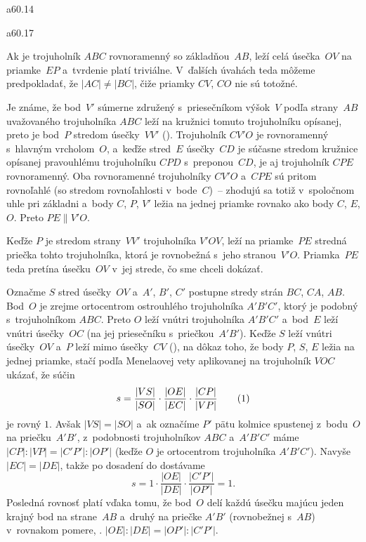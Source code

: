 {%
\epsplace a60.14 \hfil\Obr\par
\epsplace a60.17 \hfil\Obr\par
\inspicture
Ak je trojuholník $ABC$ rovnoramenný so základňou~$AB$, leží celá úsečka~$OV$ na priamke~$EP$ a~tvrdenie platí triviálne. V~ďalších úvahách teda môžeme predpokladať, že $|AC|\ne|BC|$, čiže priamky $CV$, $CO$ nie sú totožné.

Je známe, že bod~$V'$ súmerne združený s~priesečníkom výšok~$V$ podľa strany~$AB$ uvažovaného trojuholníka $ABC$ leží na kružnici tomuto trojuholníku
opísanej, preto je bod~$P$ stredom úsečky~$VV'$ (\obr).
Trojuholník $CV'O$ je rovnoramenný s~hlavným
vrcholom~$O$, a~keďže stred~$E$ úsečky~$CD$ je súčasne stredom kružnice
opísanej pravouhlému trojuholníku $CPD$ s~preponou~$CD$, je aj trojuholník $CPE$
rovnoramenný. Oba rovnoramenné trojuholníky $CV'O$ a~$CPE$ sú pritom
rovnoľahlé (so stredom rovnoľahlosti v~bode~$C$)~-- zhodujú sa totiž
v~spoločnom uhle pri základni a~body $C$, $P$, $V'$ ležia na jednej priamke rovnako ako body
$C$, $E$, $O$. Preto $PE\parallel V'O$.

Keďže $P$ je stredom strany~$VV'$ trojuholníka $V'OV$, leží na priamke~$PE$
stredná priečka tohto trojuholníka, ktorá je rovnobežná s~jeho stranou~$V'O$. Priamka~$PE$ teda pretína úsečku~$OV$ v~jej strede, čo sme chceli
dokázať.

\ineriesenie
Označme $S$ stred úsečky~$OV$ a~$A'$, $B'$, $C'$ postupne stredy strán $BC$, $CA$, $AB$. Bod~$O$ je zrejme ortocentrom ostrouhlého trojuholníka $A'B'C'$, ktorý je podobný s~trojuholníkom $ABC$. Preto $O$ leží vnútri trojuholníka $A'B'C'$ a~bod~$E$ leží vnútri úsečky~$OC$ (na jej priesečníku s~priečkou~$A'B'$).
\inspicture
Keďže $S$ leží vnútri úsečky~$OV$ a~$P$ leží mimo úsečky~$CV$ (\obr), na dôkaz toho, že body $P$, $S$, $E$ ležia na jednej priamke, stačí podľa Menelaovej vety aplikovanej na trojuholník $VOC$ ukázať, že súčin
$$
s=\frac{|VS|}{|SO|}\cdot\frac{|OE|}{|EC|}\cdot\frac{|CP|}{|VP|}
\tag1
$$
je rovný $1$. Avšak $|VS|=|SO|$ a~ak označíme $P'$ pätu kolmice spustenej z~bodu~$O$ na priečku~$A'B'$, z~podobnosti trojuholníkov $ABC$ a~$A'B'C'$ máme $|CP|:|VP|=|C'P'|:|OP'|$ (keďže $O$ je ortocentrom trojuholníka $A'B'C'$). Navyše $|EC|=|DE|$, takže po dosadení do  dostávame
$$
s=1\cdot\frac{|OE|}{|DE|}\cdot\frac{|C'P'|}{|OP'|}=1.
$$
Posledná rovnosť platí vďaka tomu, že bod~$O$ delí každú úsečku majúcu jeden krajný bod na strane~$AB$ a~druhý na priečke $A'B'$ (rovnobežnej s~$AB$) v~rovnakom pomere, \tj. $|OE|:|DE|=|OP'|:|C'P'|$.

}
